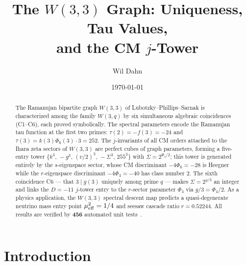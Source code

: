 \documentclass[12pt]{article}
\title{The $W(3,3)$ Graph: Uniqueness, Tau Values,\\
       and the CM $j$-Tower}
\author{Wil Dahn}
\date{\today}
\begin{document}
\maketitle

\begin{abstract}
The Ramanujan bipartite graph $W(3,3)$ of Lubotzky--Phillips--Sarnak is
characterized among the family $W(3,q)$ by six simultaneous algebraic
coincidences (C1--C6), each proved symbolically.
The spectral parameters encode the Ramanujan tau function at the first two primes:
$\tau(2)=-f(3)=-24$ and $\tau(3)=k(3)\Phi_6(3)\cdot 3=252$.
The $j$-invariants of all CM orders attached to the Ihara zeta sectors of $W(3,3)$
are perfect cubes of graph parameters, forming a five-entry tower
$\{k^3,\,-g^3,\,(v/2)^3,\,-\Sigma^3,\,255^3\}$ with $\Sigma=2^{\Phi_4/2}$;
this tower is generated entirely by the $s$-eigenspace sector, whose CM discriminant
$-4\Phi_6=-28$ is Heegner while the $r$-eigenspace discriminant $-4\Phi_4=-40$
has class number $2$. The sixth coincidence C6 --- that $3\mid g(3)$ uniquely
among prime $q$ --- makes $\Sigma=2^{g/3}$ an integer and links the $D=-11$
$j$-tower entry to the $r$-sector parameter $\Phi_4$ via $g/3=\Phi_4/2$.
As a physics application, the $W(3,3)$ spectral descent map predicts
a quasi-degenerate neutrino mass entry point $\mu_{\rm eff}^2=1/4$ and
seesaw cascade ratio $r=0.52244$. All results are verified by
$\mathbf{456}$ automated unit tests~\cite{Dahn2026repo}.
\end{abstract}

\tableofcontents
\bigskip

\section*{Introduction}
\label{sec:intro}
\end{document}
